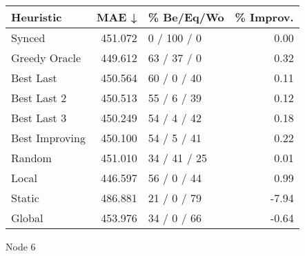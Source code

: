 \begin{tabular}{lrlr}
\toprule
\textbf{Heuristic} & \textbf{MAE ↓} & \textbf{\% Be/Eq/Wo} & \textbf{\% Improv.} \\
\midrule
            Synced &        451.072 &          0 / 100 / 0 &                0.00 \\
     Greedy Oracle &        449.612 &          63 / 37 / 0 &                0.32 \\
         Best Last &        450.564 &          60 / 0 / 40 &                0.11 \\
       Best Last 2 &        450.513 &          55 / 6 / 39 &                0.12 \\
       Best Last 3 &        450.249 &          54 / 4 / 42 &                0.18 \\
    Best Improving &        450.100 &          54 / 5 / 41 &                0.22 \\
            Random &        451.010 &         34 / 41 / 25 &                0.01 \\
             Local &        446.597 &          56 / 0 / 44 &                0.99 \\
            Static &        486.881 &          21 / 0 / 79 &               -7.94 \\
            Global &        453.976 &          34 / 0 / 66 &               -0.64 \\
\bottomrule
\end{tabular}
\caption{Node 6}
\label{tab:non_lr01_le2_bs4_6}
